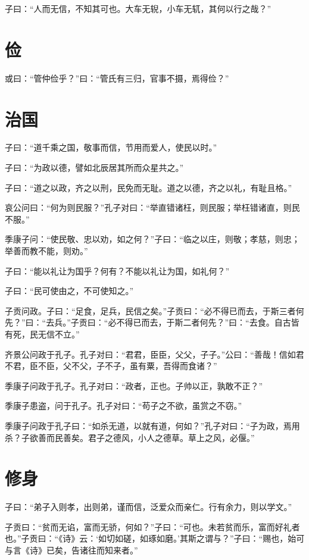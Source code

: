\documentclass[a5paper]{ctexbook}
\begin{document}
    子曰：“人而无信，不知其可也。大车无𫐐，小车无𫐄，其何以行之哉？”

    \chapter{俭}

    或曰：“管仲俭乎？”曰：“管氏有三归，官事不摄，焉得俭？”

    \chapter{治国}

    子曰：“道千乘之国，敬事而信，节用而爱人，使民以时。”

    子曰：“为政以德，譬如北辰居其所而众星共之。”

    子曰：“道之以政，齐之以刑，民免而无耻。道之以德，齐之以礼，有耻且格。”

    哀公问曰：“何为则民服？”孔子对曰：“举直错诸枉，则民服；举枉错诸直，则民不服。”

    季康子问：“使民敬、忠以劝，如之何？”子曰：“临之以庄，则敬；孝慈，则忠；举善而教不能，则劝。”

    子曰：“能以礼让为国乎？何有？不能以礼让为国，如礼何？”

    子曰：“民可使由之，不可使知之。”

    子贡问政。子曰：“足食，足兵，民信之矣。”子贡曰：“必不得已而去，于斯三者何先？”曰：“去兵。”子贡曰：“必不得已而去，于斯二者何先？”曰：“去食。自古皆有死，民无信不立。”

    齐景公问政于孔子。孔子对曰：“君君，臣臣，父父，子子。”公曰：“善哉！信如君不君，臣不臣，父不父，子不子，虽有粟，吾得而食诸？”

    季康子问政于孔子。孔子对曰：“政者，正也。子帅以正，孰敢不正？”

    季康子患盗，问于孔子。孔子对曰：“苟子之不欲，虽赏之不窃。”

    季康子问政于孔子曰：“如杀无道，以就有道，何如？”孔子对曰：“子为政，焉用杀？子欲善而民善矣。君子之德风，小人之德草。草上之风，必偃。”

    \chapter{修身}

    子曰：“弟子入则孝，出则弟，谨而信，泛爱众而亲仁。行有余力，则以学文。”

    子贡曰：“贫而无谄，富而无骄，何如？”子曰：“可也。未若贫而乐，富而好礼者也。”子贡曰：“《诗》云：‘如切如磋，如琢如磨。’其斯之谓与？”子曰：“赐也，始可与言《诗》已矣，告诸往而知来者。”
\end{document}
